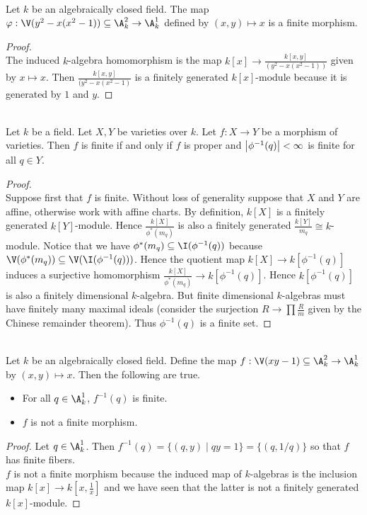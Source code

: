 \documentclass[a4paper]{article}
\begin{document}
\begin{eg}{}{}\\
Let $k$ be an algebraically closed field. The map $\varphi:\V(y^2-x(x^2-1))\subseteq\A_k^2\to\A_k^1$ defined by $(x,y)\mapsto x$ is a finite morphism. 
\begin{proof}\\
The induced $k$-algebra homomorphism is the map $k[x]\to\frac{k[x,y]}{(y^2-x(x^2-1))}$ given by $x\mapsto x$. Then $\frac{k[x,y]}{(y^2-x(x^2-1)}$ is a finitely generated $k[x]$-module because it is generated by $1$ and $y$. 
\end{proof}
\end{eg}

\begin{prp}{}{}\\
Let $k$ be a field. Let $X,Y$ be varieties over $k$. Let $f:X\to Y$ be a morphism of varieties. Then $f$ is finite if and only if $f$ is proper and $\abs{\phi^{-1}(q)}<\infty$ is finite for all $q\in Y$. 
\begin{proof}\\
Suppose first that $f$ is finite. Without loss of generality suppose that $X$ and $Y$ are affine, otherwise work with affine charts. By definition, $k[X]$ is a finitely generated $k[Y]$-module. Hence $\frac{k[X]}{\phi^\ast(m_q)}$ is also a finitely generated $\frac{k[Y]}{m_q}\cong k$-module. Notice that we have $\phi^\ast(m_q)\subseteq\I(\phi^{-1}(q))$ because $\V(\phi^\ast(m_q))\subseteq\V(\I(\phi^{-1}(q)))$. Hence the quotient map $k[X]\to k[\phi^{-1}(q)]$ induces a surjective homomorphism $\frac{k[X]}{\phi^\ast(m_q)}\to k[\phi^{-1}(q)]$. Hence $k[\phi^{-1}(q)]$ is also a finitely dimensional $k$-algebra. But finite dimensional $k$-algebras must have finitely many maximal ideals (consider the surjection $R\to\prod\frac{R}{m}$ given by the Chinese remainder theorem). Thus $\phi^{-1}(q)$ is a finite set. 
\end{proof}
\end{prp}

\begin{eg}{}{}\\
Let $k$ be an algebraically closed field. Define the map $f:\V(xy-1)\subseteq\A_k^2\to\A_k^1$ by $(x,y)\mapsto x$. Then the following are true. 
\begin{itemize}
\item For all $q\in\A_k^1$, $f^{-1}(q)$ is finite. 
\item $f$ is not a finite morphism. 
\end{itemize}
\begin{proof}
Let $q\in\A_k^1$. Then $f^{-1}(q)=\{(q,y)\;|\;qy=1\}=\{(q,1/q)\}$ so that $f$ has finite fibers. \\
$f$ is not a finite morphism because the induced map of $k$-algebras is the inclusion map $k[x]\to k\left[x,\frac{1}{x}\right]$ and we have seen that the latter is not a finitely generated $k[x]$-module. 
\end{proof}
\end{eg}
\end{document}
